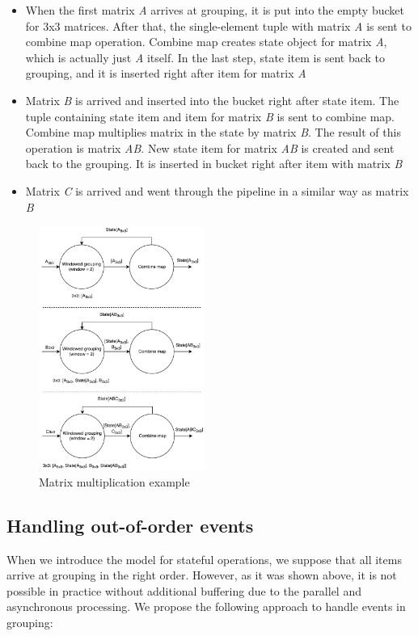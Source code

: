 \begin{itemize}
    \item When the first matrix {\it A} arrives at grouping, it is put into the empty bucket for 3x3 matrices. After that, the single-element tuple with matrix {\it A} is sent to combine map operation. Combine map creates state object for matrix {\it A}, which is actually just {\it A} itself. In the last step, state item is sent back to grouping, and it is inserted right after item for matrix {\it A}
    \item Matrix {\it B} is arrived and inserted into the bucket right after state item. The tuple containing state item and item for matrix {\it B} is sent to combine map. Combine map multiplies matrix in the state by matrix {\it B}. The result of this operation is matrix {\it AB}. New state item for matrix {\it AB} is created and sent back to the grouping. It is inserted in bucket right after item with matrix {\it B}
    \item Matrix {\it C} is arrived and went through the pipeline in a similar way as matrix {\it B}
\end{itemize}

\begin{figure}[htbp]
  \centering
  \includegraphics[width=0.48\textwidth]{pics/matrix-example}
  \caption{Matrix multiplication example}
  \label {matrix-example}
\end{figure}

\subsection{Handling out-of-order events}
When we introduce the model for stateful operations, we suppose that all items arrive at grouping in the right order. However, as it was shown above, it is not possible in practice without additional buffering due to the parallel and asynchronous processing. We propose the following approach to handle events in grouping:

